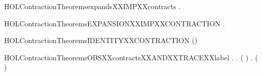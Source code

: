 \newcommand{\HOLContractionTheoremscontractsXXWEAKXXTRANSXXtauYY}{\UseVerbatim{HOLContractionTheoremscontractsXXWEAKXXTRANSXXtauYY}}
\begin{SaveVerbatim}{HOLContractionTheoremsexpandsXXIMPXXcontracts}
\HOLTokenTurnstile{} \HOLSymConst{\HOLTokenForall{}} .    \HOLSymConst{\HOLTokenImp{}}   
\end{SaveVerbatim}
\newcommand{\HOLContractionTheoremsexpandsXXIMPXXcontracts}{\UseVerbatim{HOLContractionTheoremsexpandsXXIMPXXcontracts}}
\begin{SaveVerbatim}{HOLContractionTheoremsEXPANSIONXXIMPXXCONTRACTION}
\HOLTokenTurnstile{} \HOLSymConst{\HOLTokenForall{}}.   \HOLSymConst{\HOLTokenImp{}}  
\end{SaveVerbatim}
\newcommand{\HOLContractionTheoremsEXPANSIONXXIMPXXCONTRACTION}{\UseVerbatim{HOLContractionTheoremsEXPANSIONXXIMPXXCONTRACTION}}
\begin{SaveVerbatim}{HOLContractionTheoremsIDENTITYXXCONTRACTION}
\HOLTokenTurnstile{}  (\HOLSymConst{=})
\end{SaveVerbatim}
\newcommand{\HOLContractionTheoremsIDENTITYXXCONTRACTION}{\UseVerbatim{HOLContractionTheoremsIDENTITYXXCONTRACTION}}
\begin{SaveVerbatim}{HOLContractionTheoremsOBSXXcontractsXXANDXXTRACEXXlabel}
\HOLTokenTurnstile{} \HOLSymConst{\HOLTokenForall{}} .
          \HOLSymConst{\HOLTokenImp{}}
       \HOLSymConst{\HOLTokenForall{}}  .
               \HOLSymConst{\HOLTokenConj{}}  ( )  \HOLSymConst{\HOLTokenImp{}}
           \HOLSymConst{\HOLTokenExists{}} .
                   \HOLSymConst{\HOLTokenConj{}}    \HOLSymConst{\HOLTokenConj{}}
                 \HOLSymConst{\HOLTokenLeq{}}   \HOLSymConst{\HOLTokenConj{}}
                ( ) 
\end{SaveVerbatim}
